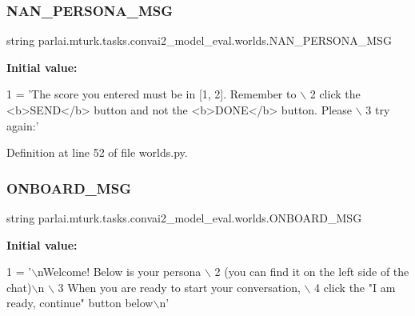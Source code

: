 \subsubsection{\texorpdfstring{N\+A\+N\+\_\+\+P\+E\+R\+S\+O\+N\+A\+\_\+\+M\+SG}{NAN\_PERSONA\_MSG}}
{\footnotesize\ttfamily string parlai.\+mturk.\+tasks.\+convai2\+\_\+model\+\_\+eval.\+worlds.\+N\+A\+N\+\_\+\+P\+E\+R\+S\+O\+N\+A\+\_\+\+M\+SG}

{\bfseries Initial value\+:}
\begin{DoxyCode}
1 =  \textcolor{stringliteral}{'The score you entered must be in [1, 2]. Remember to \(\backslash\)}
2 \textcolor{stringliteral}{        click the <b>SEND</b> button and not the <b>DONE</b> button. Please \(\backslash\)}
3 \textcolor{stringliteral}{        try again:'}
\end{DoxyCode}


Definition at line 52 of file worlds.\+py.

\mbox{\label{namespaceparlai_1_1mturk_1_1tasks_1_1convai2__model__eval_1_1worlds_ac4e8ac2c78113619ccf2cd30f6104ba9}} 
\subsubsection{\texorpdfstring{O\+N\+B\+O\+A\+R\+D\+\_\+\+M\+SG}{ONBOARD\_MSG}}
{\footnotesize\ttfamily string parlai.\+mturk.\+tasks.\+convai2\+\_\+model\+\_\+eval.\+worlds.\+O\+N\+B\+O\+A\+R\+D\+\_\+\+M\+SG}

{\bfseries Initial value\+:}
\begin{DoxyCode}
1 =  \textcolor{stringliteral}{'\(\backslash\)nWelcome! Below is your persona \(\backslash\)}
2 \textcolor{stringliteral}{        (you can find it on the left side of the chat)\(\backslash\)n \(\backslash\)}
3 \textcolor{stringliteral}{        When you are ready to start your conversation, \(\backslash\)}
4 \textcolor{stringliteral}{        click the "I am ready, continue" button below\(\backslash\)n'}
\end{DoxyCode}


